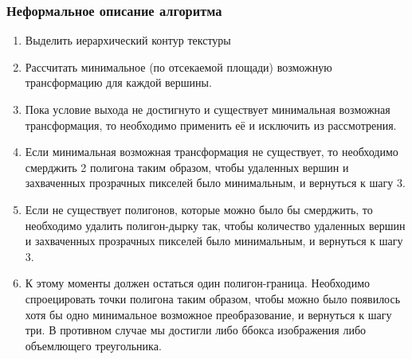 \documentclass{fefu_thesis/cls/fefu}
\begin{document}
    \subsubsection{Неформальное описание алгоритма}
        \begin{enumerate}
            \item Выделить иерархический контур текстуры
            \item Рассчитать минимальное (по отсекаемой площади) возможную трансформацию для каждой вершины.
            \item Пока условие выхода не достигнуто и существует минимальная возможная трансформация, то необходимо применить её и исключить из рассмотрения.
            \item Если минимальная возможная трансформация не существует, то необходимо смерджить 2 полигона таким образом, чтобы удаленных вершин и захваченных прозрачных пикселей было минимальным, и вернуться к шагу 3.
            \item Если не существует полигонов, которые можно было бы смерджить, то необходимо удалить полигон-дырку так, чтобы количество удаленных вершин и захваченных прозрачных пикселей было минимальным, и вернуться к шагу 3.
            \item К этому моменты должен остаться один полигон-граница. Необходимо спроецировать точки полигона таким образом, чтобы можно было появилось хотя бы одно минимальное возможное преобразование, и вернуться к шагу три. В противном случае мы достигли либо ббокса изображения либо объемлющего треугольника.
        \end{enumerate}
\end{document}
